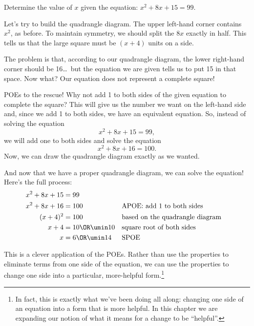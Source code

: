 \begin{boxedexplore}
Determine the value of $x$ given the equation: $x^2 + 8x + 15 = 99$.
\end{boxedexplore} %

Let's try to build the quadrangle diagram. The upper left-hand corner contains $x^2$, as before. To maintain symmetry, we should split the $8x$ exactly in half. This tells us that the large square must be $(x+4)$ units on a side.


The problem is that, according to our quadrangle diagram, the lower right-hand corner should be 16\ldots\ but the equation we are given tells us to put 15 in that space. Now what? Our equation does not represent a complete square!


POEs to the rescue! Why not add 1 to both sides of the given equation to complete the square? This will give us the number we want on the left-hand side and, since we add 1 to both sides, we have an equivalent equation. So, instead of solving the equation
\[x^2 + 8x + 15 = 99,\]
we will add one to both sides and solve the equation
\[x^2 + 8x + 16 = 100.\]
Now, we can draw the quadrangle diagram exactly as we wanted.


And now that we have a proper quadrangle diagram, we can solve the equation! Here's the full process:
\begin{align*}
x^2 + 8x + 15 &= 99
\\
x^2 + 8x + 16 &= 100
&&\text{APOE: add 1 to both sides}
\\
(x+4)^2 &= 100
&&\text{based on the quadrangle diagram}
\\
x+4 &= 10 \OR \umin10
&&\text{square root of both sides}
\\
x &= 6 \OR \umin14
&&\text{SPOE}
\end{align*}

This is a clever application of the POEs. Rather than use the properties to eliminate terms from one side of the equation, we can use the properties to change one side into a particular, more-helpful form.\footnote{In fact, this is exactly what we've been doing all along: changing one side of an equation into a form that is more helpful. In this chapter we are expanding our notion of what it means for a change to be ``helpful''.}

